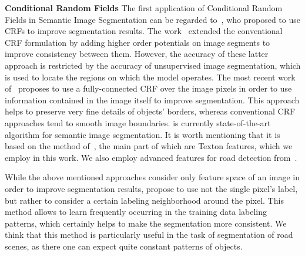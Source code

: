 {\bf Conditional Random Fields} \qquad The first application of Conditional Random Fields in Semantic Image Segmentation can be regarded to~\cite{Lafferty2001}, who proposed
to use CRFs to improve segmentation results. The work~\cite{Ladicky2009} extended the conventional CRF formulation by adding higher order
potentials on image segments to improve consistency between them. However, the accuracy of these latter approach is restricted by 
the accuracy of unsupervised image segmentation, which is used to locate the regions on which the model operates. The most recent 
work of~\cite{Krahenbuhl2011} proposes to use a fully-connected CRF over the image pixels in order to use information contained in
the image itself to improve segmentation. This approach helps to preserve very fine details of objects' borders, whereas conventional
CRF approaches tend to smooth image boundaries. \cite{Krahenbuhl2011} is currently state-of-the-art algorithm for semantic image segmentation.
It is worth mentioning that it is based on the method of~\cite{Shotton2009}, the main part of which are Texton features, which we employ in this work.
We also employ advanced features for road detection from~\cite{Wojek2008}.

While the above mentioned approaches consider only feature space of an image in order to improve segmentation results, \cite{Kontschieder2011}
propose to use not the single pixel's label, but rather to consider a certain labeling neighborhood around the pixel. This method allows
to learn frequently occurring in the training data labeling patterns, which certainly helps to make the segmentation more consistent. We think
that this method is particularly useful in the task of segmentation of road scenes, as there one can expect quite constant patterns of objects.

